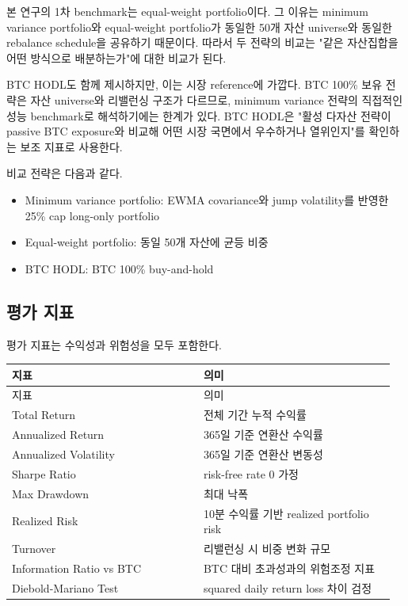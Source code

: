 \documentclass[12pt,a4paper]{article}
\begin{document}
본 연구의 1차 benchmark는 equal-weight portfolio이다. 그 이유는 minimum variance portfolio와 equal-weight portfolio가 동일한 50개 자산 universe와 동일한 rebalance schedule을 공유하기 때문이다. 따라서 두 전략의 비교는 "같은 자산집합을 어떤 방식으로 배분하는가"에 대한 비교가 된다.

BTC HODL도 함께 제시하지만, 이는 시장 reference에 가깝다. BTC 100\% 보유 전략은 자산 universe와 리밸런싱 구조가 다르므로, minimum variance 전략의 직접적인 성능 benchmark로 해석하기에는 한계가 있다. BTC HODL은 "활성 다자산 전략이 passive BTC exposure와 비교해 어떤 시장 국면에서 우수하거나 열위인지"를 확인하는 보조 지표로 사용한다.

비교 전략은 다음과 같다.

\begin{itemize}
\item Minimum variance portfolio: EWMA covariance와 jump volatility를 반영한 25\% cap long-only portfolio
\item Equal-weight portfolio: 동일 50개 자산에 균등 비중
\item BTC HODL: BTC 100\% buy-and-hold
\end{itemize}

\subsection{평가 지표}

평가 지표는 수익성과 위험성을 모두 포함한다.

\begin{center}
\small
\begin{longtable}{@{}p{0.48\linewidth}p{0.48\linewidth}@{}}
\toprule
지표 & 의미 \\
\midrule
\endfirsthead
\toprule
지표 & 의미 \\
\midrule
\endhead
Total Return & 전체 기간 누적 수익률 \\
Annualized Return & 365일 기준 연환산 수익률 \\
Annualized Volatility & 365일 기준 연환산 변동성 \\
Sharpe Ratio & risk-free rate 0 가정 \\
Max Drawdown & 최대 낙폭 \\
Realized Risk & 10분 수익률 기반 realized portfolio risk \\
Turnover & 리밸런싱 시 비중 변화 규모 \\
Information Ratio vs BTC & BTC 대비 초과성과의 위험조정 지표 \\
Diebold-Mariano Test & squared daily return loss 차이 검정 \\
\bottomrule
\end{longtable}
\end{center}
\end{document}
